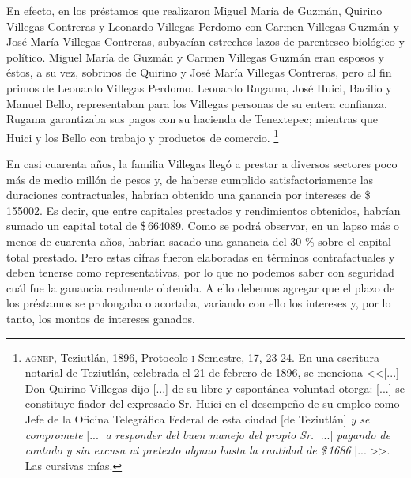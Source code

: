 \documentclass[14pt,twoside,final]{extbook} %
\let\oldfootnote\footnote
\renewcommand\footnote[1]{%
\oldfootnote{\hspace{1mm}#1}}
\begin{document}
En efecto, en los préstamos que realizaron Miguel María de Guzmán, Quirino Villegas Contreras y Leonardo Villegas Perdomo con Carmen Villegas Guzmán y José María Villegas Contreras, subyacían estrechos lazos de parentesco biológico y político. Miguel María de Guzmán y Carmen Villegas Guzmán eran esposos y éstos, a su vez, sobrinos de Quirino y José María Villegas Contreras, pero al fin primos de Leonardo Villegas Perdomo. Leonardo Rugama, José Huici, Bacilio y Manuel Bello, representaban para los Villegas personas de su entera confianza. Rugama garantizaba sus pagos con su
hacienda de Tenextepec; mientras que Huici y los Bello con trabajo y productos de comercio.\footnote{\textsc{agnep}, Teziutlán, 1896, Protocolo \textsc{i} Semestre, 17, 23-24. En una escritura notarial de Teziutlán, celebrada el 21 de febrero de 1896, se menciona <<[...] Don Quirino Villegas dijo [...] de su libre y espontánea voluntad otorga: [...] se constituye fiador del expresado Sr. Huici en el desempeño de su empleo como Jefe de la Oficina Telegráfica Federal de esta ciudad [de Teziutlán] \emph{y se compromete} [...] \emph{a responder del buen manejo del propio Sr.} [...] \emph{pagando de contado y sin excusa ni pretexto alguno hasta la cantidad de \$\,1686} [...]>>. Las cursivas mías.}

En casi cuarenta años, la familia Villegas llegó a prestar a diversos sectores poco más de medio millón de pesos y, de haberse cumplido satisfactoriamente las duraciones contractuales, habrían obtenido una ganancia por intereses de \$\,155002. Es decir, que entre capitales prestados y rendimientos obtenidos, habrían sumado un capital total de \$\,664089. Como se podrá observar, en un lapso más o menos de cuarenta años, habrían sacado una ganancia del 30 \% sobre el capital total prestado. Pero estas cifras fueron elaboradas en términos contrafactuales y deben tenerse como representativas, por lo que no podemos saber con seguridad cuál fue la ganancia realmente obtenida. A
ello debemos agregar que el plazo de los préstamos se prolongaba o acortaba, variando con ello los intereses y, por lo tanto, los montos de intereses ganados.
\end{document}
